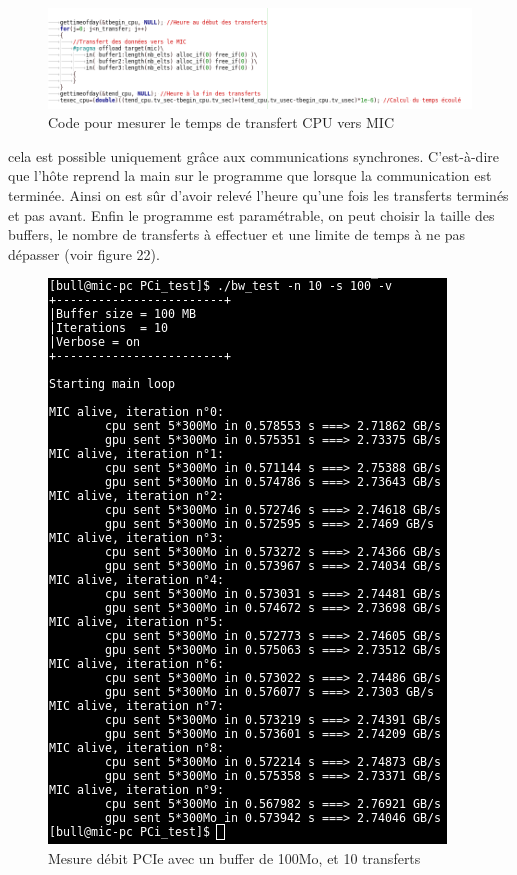 \documentclass[11pt]{article}
\begin{document}
					\begin{figure}
					\begin{center}
					\includegraphics[scale=0.5]{code.png}
					\caption{Code pour mesurer le temps de transfert CPU vers MIC}
					\end{center}
					\end{figure}
					cela est possible uniquement grâce aux communications synchrones. C'est-à-dire que l'hôte reprend la main 
					sur le programme que lorsque la communication est terminée. Ainsi on est sûr d'avoir relevé l'heure qu'une 
					fois les transferts terminés et pas avant. Enfin le programme est paramétrable, on peut choisir la taille 
					des buffers, le nombre de transferts à effectuer et une limite de temps à ne pas dépasser (voir figure 22).
					\begin{figure}
					\begin{center}
					\includegraphics[scale=0.4]{bwtest.png}
					\caption{Mesure débit PCIe avec un buffer de 100Mo, et 10 transferts}
					\end{center}
					\end{figure}
\end{document}
